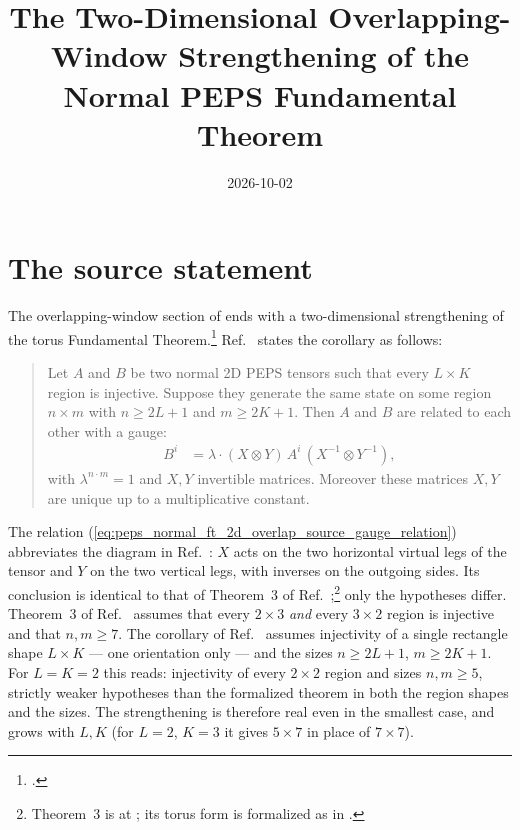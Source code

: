\documentclass{article}
\title{The Two-Dimensional Overlapping-Window Strengthening of the
Normal PEPS Fundamental Theorem}
\author{}
\date{2026-10-02}
\begin{document}
\maketitle
{}

\section{The source statement}

The overlapping-window section of \cite{Molnar2018NormalPEPS} ends
with a two-dimensional strengthening of the torus Fundamental Theorem.\footnote{.}
Ref.~\cite{Molnar2018NormalPEPS} states the corollary as follows:

\begin{quote}
    Let $A$ and $B$ be two normal 2D PEPS tensors such that every
    $L \times K$ region is injective. Suppose they generate the same state
    on some region $n\times m$ with $n \geq 2L+1$ and $m\geq 2K+1$. Then
    $A$ and $B$ are related to each other with a gauge:
    \begin{align}
        B^i
         & = \lambda \cdot (X \otimes Y)\, A^i\,
        (X^{-1} \otimes Y^{-1}),
        \label{eq:peps_normal_ft_2d_overlap_source_gauge_relation}
    \end{align}
    with $\lambda^{n\cdot m} = 1$ and $X,Y$ invertible matrices. Moreover
    these matrices $X,Y$ are unique up to a multiplicative constant.
\end{quote}

The relation (\ref{eq:peps_normal_ft_2d_overlap_source_gauge_relation})
abbreviates the diagram in Ref.~\cite{Molnar2018NormalPEPS}: $X$ acts on the
two horizontal virtual legs of the tensor and $Y$ on the two vertical legs,
with inverses on the outgoing sides. Its conclusion is identical to that of
Theorem~3 of Ref.~\cite{Molnar2018NormalPEPS};\footnote{Theorem~3 is at
    ; its torus form is
    formalized as
     in
    .} only the hypotheses
differ. Theorem~3 of Ref.~\cite{Molnar2018NormalPEPS} assumes that every
$2\times3$ \emph{and} every $3\times2$ region is injective and that
$n, m \geq 7$. The corollary of Ref.~\cite{Molnar2018NormalPEPS} assumes
injectivity of a single rectangle shape $L \times K$ --- one
orientation only --- and the sizes $n \geq 2L+1$, $m \geq 2K+1$. For
$L = K = 2$ this reads: injectivity of every $2\times2$ region and sizes
$n, m \geq 5$, strictly weaker hypotheses than the formalized theorem in
both the region shapes and the sizes. The strengthening is therefore
real even in the smallest case, and grows with $L, K$ (for $L=2$,
$K=3$ it gives $5 \times 7$ in place of $7 \times 7$).
\end{document}
